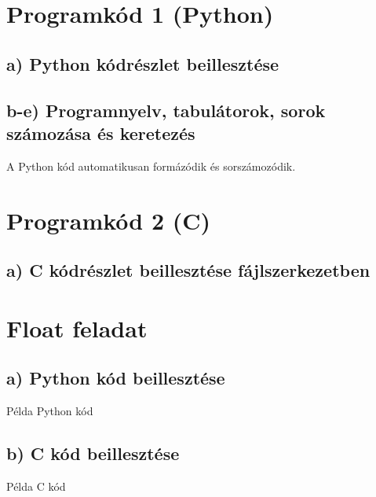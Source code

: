 \documentclass[a4paper,12pt]{article}
\begin{document}
\newpage

\section{Programkód 1 (Python)}

\subsection{a) Python kódrészlet beillesztése}


\subsection{b-e) Programnyelv, tabulátorok, sorok számozása és keretezés}
A Python kód automatikusan formázódik és sorszámozódik.

\newpage

\section{Programkód 2 (C)}

\subsection{a) C kódrészlet beillesztése fájlszerkezetben}


\newpage



\section{Float feladat}

\subsection{a) Python kód beillesztése}
\begin{PythonCode}[H]
    \caption{Példa Python kód}
    
\end{PythonCode}

\subsection{b) C kód beillesztése}
\begin{CCode}[H]
    \caption{Példa C kód}
    
\end{CCode}
\end{document}
